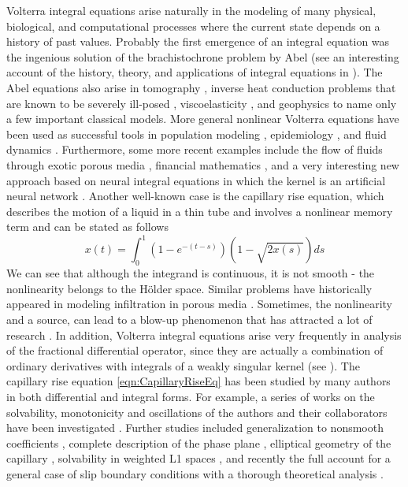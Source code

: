\documentclass[12pt,a4paper]{article}
\begin{document}
Volterra integral equations arise naturally in the modeling of many physical, biological, and computational processes where the current state depends on a history of past values. Probably the first emergence of an integral equation was the ingenious solution of the brachistochrone problem by Abel (see an interesting account of the history, theory, and applications of integral equations in \cite{brunner2017volterra}). The Abel equations also arise in tomography \cite{deutsch1990inversion}, inverse heat conduction problems that are known to be severely ill-posed \cite{beck1996comparison,lamm2000survey}, viscoelasticity \cite{anderssen2008volterra}, and geophysics \cite{eskola2012geophysical} to name only a few important classical models. More general nonlinear Volterra equations have been used as successful tools in population modeling \cite{brauer1975nonlinear,brauer1976constant}, epidemiology \cite{guan2022global}, and fluid dynamics \cite{curle1978solution, keller1981propagation}. Furthermore, some more recent examples include the flow of fluids through exotic porous media \cite{plociniczak2018existence,lopez2024time, gerolymatou2006modelling}, financial mathematics \cite{zhu2018new}, and a very interesting new approach based on neural integral equations in which the kernel is an artificial neural network \cite{zappala2024learning}. Another well-known case is the capillary rise equation, which describes the motion of a liquid in a thin tube and involves a nonlinear memory term \cite{cai2021lucas, plociniczak2018monotonicity,okrasinska2020solvability} and can be stated as follows
\begin{equation}\label{eqn:CapillaryRiseEq}
	x(t) = \int_0^1 (1-e^{-(t-s)}) \left(1-\sqrt{2 x(s)}\right)ds
\end{equation}
We can see that although the integrand is continuous, it is not smooth - the nonlinearity belongs to the H\"older space. Similar problems have historically appeared in modeling infiltration in porous media \cite{bushell1990nonlinear}. Sometimes, the nonlinearity and a source, can lead to a blow-up phenomenon that has attracted a lot of research \cite{olmstead1995coupled}. In addition, Volterra integral equations arise very frequently in analysis of the fractional differential operator, since they are actually a combination of ordinary derivatives with integrals of a weakly singular kernel (see \cite{kilbas2006theory}). The capillary rise equation \eqref{eqn:CapillaryRiseEq} has been studied by many authors in both differential \cite{grunding2020enhanced, quere1997inertial, zhmud2000dynamics} and integral forms. For example, a series of works on the solvability, monotonicity and oscillations of the authors and their collaborators have been investigated \cite{okrasinska2020solvability, plociniczak2018monotonicity, plociniczak2021oscillatory}. Further studies included generalization to nonsmooth coefficients \cite{fricke2023analytical}, complete description of the phase plane \cite{zhang2018dynamics}, elliptical geometry of the capillary \cite{alassar2022note}, solvability in weighted L1 spaces \cite{metwali2022solvability}, and recently the full account for a general case of slip boundary conditions with a thorough theoretical analysis \cite{rapajic2025modelling}. 
\end{document}
